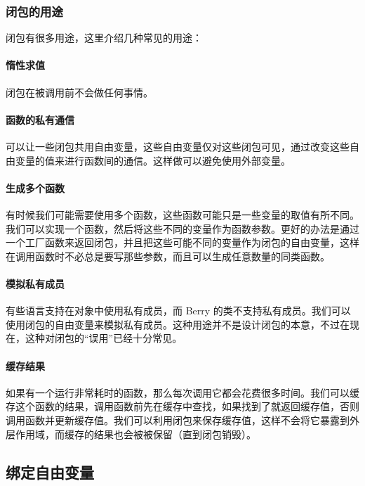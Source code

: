\subsubsection{闭包的用途}

闭包有很多用途，这里介绍几种常见的用途：

\paragraph{惰性求值}

闭包在被调用前不会做任何事情。

\paragraph{函数的私有通信}

可以让一些闭包共用自由变量，这些自由变量仅对这些闭包可见，通过改变这些自由变量的值来进行函数间的通信。这样做可以避免使用外部变量。

\paragraph{生成多个函数}

有时候我们可能需要使用多个函数，这些函数可能只是一些变量的取值有所不同。我们可以实现一个函数，然后将这些不同的变量作为函数参数。更好的办法是通过一个工厂函数来返回闭包，并且把这些可能不同的变量作为闭包的自由变量，这样在调用函数时不必总是要写那些参数，而且可以生成任意数量的同类函数。

\paragraph{模拟私有成员}

有些语言支持在对象中使用私有成员，而 Berry 的类不支持私有成员。我们可以使用闭包的自由变量来模拟私有成员。这种用途并不是设计闭包的本意，不过在现在，这种对闭包的“误用”已经十分常见。

\paragraph{缓存结果}

如果有一个运行非常耗时的函数，那么每次调用它都会花费很多时间。我们可以缓存这个函数的结果，调用函数前先在缓存中查找，如果找到了就返回缓存值，否则调用函数并更新缓存值。我们可以利用闭包来保存缓存值，这样不会将它暴露到外层作用域，而缓存的结果也会被被保留（直到闭包销毁）。

\subsection{绑定自由变量}

